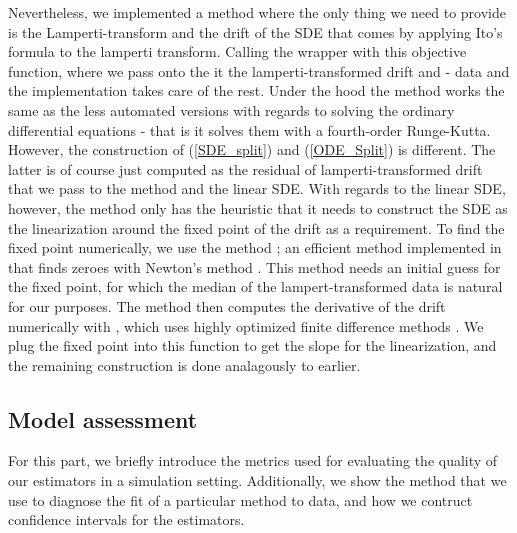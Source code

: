 Nevertheless, we implemented a method where the only thing we need to provide is the Lamperti-transform and the drift of the SDE that comes by applying Ito's formula to the lamperti transform. Calling the wrapper with this objective function, where we pass onto the it the lamperti-transformed drift and - data and the implementation takes care of the rest. Under the hood the method works the same as the less automated versions with regards to solving the ordinary differential equations - that is it solves them with a fourth-order Runge-Kutta. However, the construction of (\ref{SDE_split}) and (\ref{ODE_Split}) is different. The latter is of course just computed as the residual of lamperti-transformed drift that we pass to the method and the linear SDE. With regards to the linear SDE, however, the method only has the heuristic that it needs to construct the SDE as the linearization around the fixed point of the drift as a requirement. To find the fixed point numerically, we use the method ; an efficient method implemented in  that finds zeroes with Newton's method \cite{nleqslv}. This method needs an initial guess for the fixed point, for which the median of the lampert-transformed data is natural for our purposes. The method then computes the derivative of the drift numerically with , which uses highly optimized finite difference methods \cite{numDeriv}. We plug the fixed point into this function to get the slope for the linearization, and the remaining construction is done analagously to earlier.
\subsection{Model assessment}
For this part, we briefly introduce the metrics used for evaluating the quality of our estimators in a simulation setting. Additionally, we show the method that we use to diagnose the fit of a particular method to data, and how we contruct confidence intervals for the estimators.
